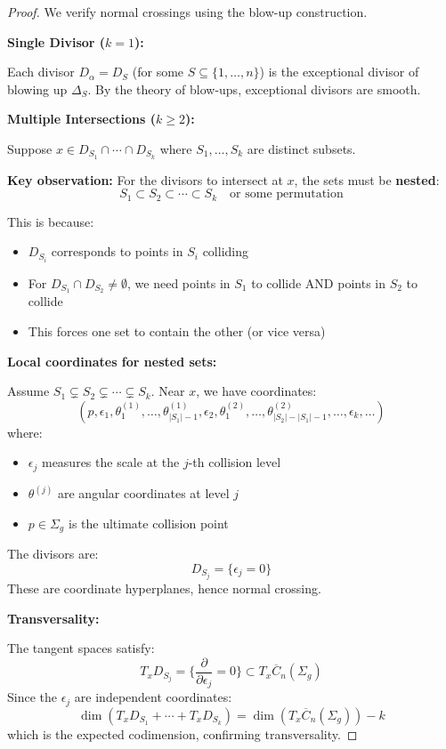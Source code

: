 \begin{proof}
We verify normal crossings using the blow-up construction.

\medskip
\noindent\textbf{Single Divisor ($k=1$):}

Each divisor $D_\alpha = D_S$ (for some $S \subseteq \{1,\ldots,n\}$) is the exceptional divisor of blowing up $\Delta_S$. By the theory of blow-ups, exceptional divisors are smooth.

\medskip
\noindent\textbf{Multiple Intersections ($k \geq 2$):}

Suppose $x \in D_{S_1} \cap \cdots \cap D_{S_k}$ where $S_1, \ldots, S_k$ are distinct subsets. 

\textbf{Key observation:} For the divisors to intersect at $x$, the sets must be \textbf{nested}:
$$S_1 \subset S_2 \subset \cdots \subset S_k \quad \text{or some permutation}$$

This is because:
\begin{itemize}
\item $D_{S_i}$ corresponds to points in $S_i$ colliding
\item For $D_{S_1} \cap D_{S_2} \neq \emptyset$, we need points in $S_1$ to collide AND points in $S_2$ to collide
\item This forces one set to contain the other (or vice versa)
\end{itemize}

\textbf{Local coordinates for nested sets:}

Assume $S_1 \subsetneq S_2 \subsetneq \cdots \subsetneq S_k$. Near $x$, we have coordinates:
$$(p, \epsilon_1, \theta_1^{(1)}, \ldots, \theta_{|S_1|-1}^{(1)}, \epsilon_2, \theta_1^{(2)}, \ldots, \theta_{|S_2|-|S_1|-1}^{(2)}, \ldots, \epsilon_k, \ldots)$$
where:
\begin{itemize}
\item $\epsilon_j$ measures the scale at the $j$-th collision level
\item $\theta^{(j)}$ are angular coordinates at level $j$
\item $p \in \Sigma_g$ is the ultimate collision point
\end{itemize}

The divisors are:
$$D_{S_j} = \{\epsilon_j = 0\}$$
These are coordinate hyperplanes, hence normal crossing.

\medskip
\noindent\textbf{Transversality:}

The tangent spaces satisfy:
$$T_x D_{S_j} = \{\frac{\partial}{\partial \epsilon_j} = 0\} \subset T_x \overline{C}_n(\Sigma_g)$$
Since the $\epsilon_j$ are independent coordinates:
$$\dim(T_x D_{S_1} + \cdots + T_x D_{S_k}) = \dim(T_x \overline{C}_n(\Sigma_g)) - k$$
which is the expected codimension, confirming transversality.
\end{proof}


